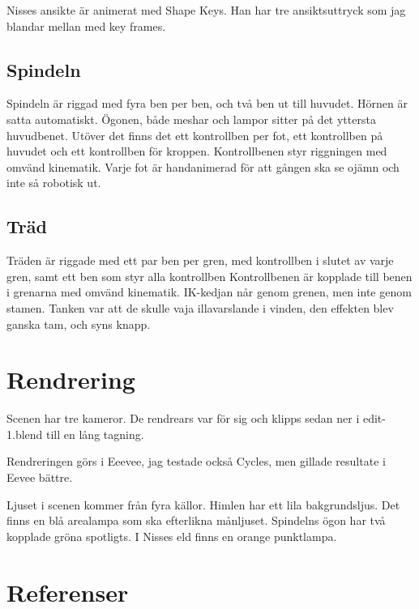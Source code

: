 \documentclass{article}
\begin{document}
Nisses ansikte är animerat med Shape Keys. Han har tre ansiktsuttryck som jag blandar mellan med key frames.

\subsection{Spindeln}

Spindeln är riggad med fyra ben per ben, och två ben ut till huvudet. Hörnen är satta automatiskt. Ögonen, både meshar och lampor sitter på det yttersta huvudbenet. Utöver det finns det ett kontrollben per fot, ett kontrollben på huvudet och ett kontrollben för kroppen. Kontrollbenen styr riggningen med omvänd kinematik. Varje fot är handanimerad för att gången ska se ojämn och inte så robotisk ut. 

\subsection{Träd}

Träden är riggade med ett par ben per gren, med kontrollben i slutet av varje gren, samt ett ben som styr alla kontrollben Kontrollbenen är kopplade till benen i grenarna med omvänd kinematik. IK-kedjan når genom grenen, men inte genom stamen. Tanken var att de skulle vaja illavarslande i vinden, den effekten blev ganska tam, och syns knapp.

\section{Rendrering}

Scenen har tre kameror. De rendrears var för sig och klipps sedan ner i edit-1.blend till en lång tagning. 

Rendreringen görs i Eeevee, jag testade också Cycles, men gillade resultate i Eevee bättre.

Ljuset i scenen kommer från fyra källor. Himlen har ett lila bakgrundsljus. Det finns en blå arealampa som ska efterlikna månljuset. Spindelns ögon har två kopplade gröna spotligts. I Nisses eld finns en orange punktlampa.

\section{Referenser}
 

\end{document}
